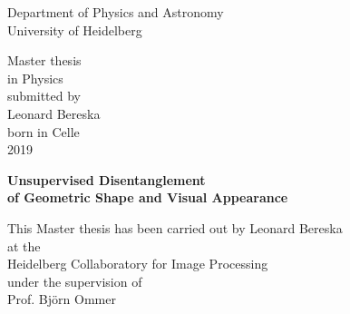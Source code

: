 
\thispagestyle{empty}
\begin{center}
  \renewcommand{\baselinestretch}{2.00}
  \Large\sffamily
  Department of Physics and Astronomy\\
  \large University of Heidelberg
  \par\vfill\normalfont
  Master thesis\\
  in Physics\\
  submitted by\\
  Leonard Bereska\\
  born in Celle\\
	2019
\end{center}
\newpage

\thispagestyle{empty}
\begin{center}
  \renewcommand{\baselinestretch}{2.00}
  \Large\bfseries\sffamily
    Unsupervised Disentanglement\\
    of Geometric Shape and Visual Appearance
  \par
  \vfill
  \large\normalfont
  This Master thesis has been carried out by Leonard Bereska\\
  at the\\
  Heidelberg Collaboratory for Image Processing\\
  under the supervision of\\
  Prof. Björn Ommer
\end{center}\par
\vspace{5\baselineskip}

\renewcommand{\baselinestretch}{1.00}\normalsize

